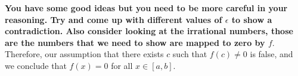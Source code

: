 \documentclass{report}
\begin{document}
\textbf{
  You have some good ideas but you need to be more careful in your reasoning. Try and come up with different values of $\epsilon$ to show a contradiction. Also consider looking at the irrational numbers, those are the numbers that we need to show are mapped to zero by $f.$
} 
Therefore, our assumption that there exists $c$ such that $f(c) \neq 0$ is false, and we conclude that $f(x)=0$ for all $x \in[a, b]$.
\end{document}

